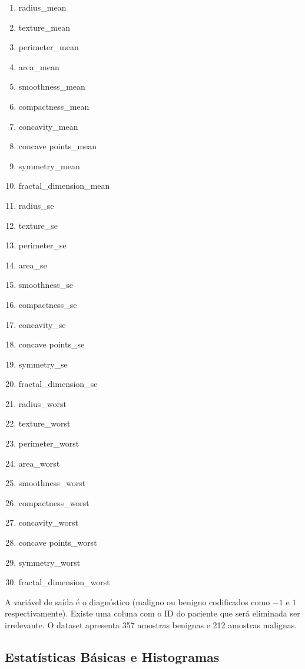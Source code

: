 \documentclass[11pt,a4paper]{article}
\numberwithin{equation}{section}
\begin{document}
\begin{multicols}{3}
\begin{enumerate}
    \item radius\_mean	
    \item texture\_mean
    \item perimeter\_mean
    \item area\_mean
    \item smoothness\_mean
    \item compactness\_mean
    \item concavity\_mean
    \item concave points\_mean
    \item symmetry\_mean
    \item fractal\_dimension\_mean
    \item radius\_se
    \item texture\_se
    \item perimeter\_se
    \item area\_se
    \item smoothness\_se
    \item compactness\_se
    \item concavity\_se
    \item concave points\_se
    \item symmetry\_se
    \item fractal\_dimension\_se
    \item radius\_worst
    \item texture\_worst
    \item perimeter\_worst
    \item area\_worst
    \item smoothness\_worst
    \item compactness\_worst
    \item concavity\_worst
    \item concave points\_worst
    \item symmetry\_worst
    \item fractal\_dimension\_worst
\end{enumerate}
\end{multicols}

A variável de saída é o diagnóstico (maligno ou benigno codificados como $-1$ e $1$ respectivamente). Existe uma coluna com o ID do paciente que será eliminada ser irrelevante. O dataset apresenta 357 amostras benignas e 212 amostras malignas. 

\subsection{Estatísticas Básicas e Histogramas}
\end{document}
